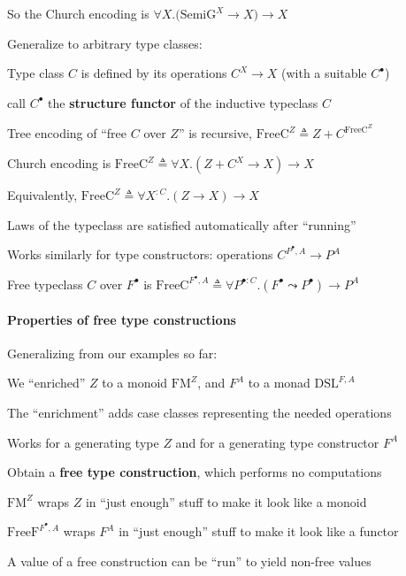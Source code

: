 So the Church encoding is $\forall X.\big(\text{SemiG}^{X}\rightarrow X\big)\rightarrow X$

Generalize to arbitrary type classes:

Type class $C$ is defined by its operations{\footnotesize{} $C^{X}\rightarrow X$}
(with a suitable $C^{\bullet}$)

call $C^{\bullet}$ the \textbf{structure functor} of the inductive
typeclass $C$

Tree encoding of \textsf{``}free $C$ over $Z$\textsf{''} is recursive, $\text{FreeC}^{Z}\triangleq Z+C^{\text{FreeC}^{Z}}$

Church encoding is $\text{FreeC}^{Z}\triangleq\forall X.\left(Z+C^{X}\rightarrow X\right)\rightarrow X$

Equivalently, $\text{FreeC}^{Z}\triangleq\forall X^{:C}.\left(Z\rightarrow X\right)\rightarrow X$

Laws of the typeclass are satisfied automatically after \textsf{``}running\textsf{''}

Works similarly for type constructors: operations $C^{P^{\bullet},A}\rightarrow P^{A}$

Free typeclass $C$ over $F^{\bullet}$ is $\text{FreeC}^{F^{\bullet},A}\triangleq\forall P^{\bullet:C}.\left(F^{\bullet}\leadsto P^{\bullet}\right)\rightarrow P^{A}$

\paragraph{Properties of free type constructions}

Generalizing from our examples so far:

We \textsf{``}enriched\textsf{''} $Z$ to a monoid $\text{FM}^{Z}$, and $F^{A}$
to a monad $\text{DSL}^{F,A}$ 

The \textsf{``}enrichment\textsf{''} adds case classes representing the needed operations

Works for a generating type $Z$ and for a generating type constructor
$F^{A}$

Obtain a \textbf{free type construction}, which performs no computations

$\text{FM}^{Z}$ wraps $Z$ in \textsf{``}just enough\textsf{''} stuff to make it
look like a monoid

$\text{FreeF}^{F^{\bullet},A}$ wraps $F^{A}$ in \textsf{``}just enough\textsf{''}
stuff to make it look like a functor

A value of a free construction can be \textsf{``}run\textsf{''} to yield non-free
values 

